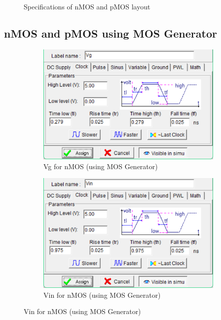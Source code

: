 \documentclass[a4paper,12pt]{article}
\begin{document}
\begin{figure}[H]
		\caption{Specifications of nMOS and pMOS layout}
		\label{fig:1}
	\end{figure}
	
	\subsection{nMOS and pMOS using MOS Generator}
	
	\begin{figure}[H]
		\centering
		\begin{subfigure}[t]{0.49\textwidth}
			\centering
			\includegraphics[width=.75\textwidth , height=.15\textheight]{Images/Builtin nmos/nspec4.png}
			\caption{Vg for nMOS (using MOS Generator)}
			\label{fig:3-f}
		\end{subfigure}
		\hfill
		\begin{subfigure}[t]{0.49\textwidth}
			\centering
			\includegraphics[width=.75\textwidth, height=0.15\textheight]{Images/Builtin nmos/nspec5.png}
			\caption{Vin for nMOS (using MOS Generator)}
			\label{fig:3-g}
		\end{subfigure}
		
		\vspace{1em}
		

\end{figure}
\end{document}
